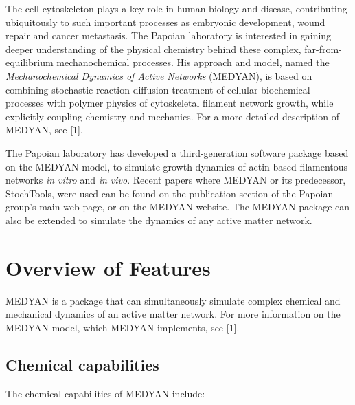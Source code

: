 \documentclass[11pt, oneside]{article}   	%
\begin{document}
 The cell cytoskeleton plays a key role in human biology and disease, contributing ubiquitously
 to such important processes as embryonic development, wound repair and cancer 
 metastasis. The Papoian laboratory is interested in gaining deeper understanding of the
 physical chemistry behind these complex, far-from-equilibrium mechanochemical 
 processes. His approach and model, named the \textit{Mechanochemical Dynamics of Active Networks} 
 (MEDYAN), is based on combining stochastic reaction-diffusion treatment
 of cellular biochemical processes with polymer physics of cytoskeletal filament network 
 growth, while explicitly coupling chemistry and mechanics. For a more detailed description of MEDYAN, see [1].
 
 The Papoian laboratory has developed a third-generation software package based on the MEDYAN
 model, to simulate growth dynamics of actin based filamentous networks \textit{in vitro} and 
 \textit{in vivo}. Recent papers where MEDYAN or its predecessor, StochTools, were used 
 can be found on the publication section of the Papoian group's main web page, or on the MEDYAN website. 
 The MEDYAN package can also be extended to simulate the dynamics of any active matter network.

\section {Overview of Features}

MEDYAN is a package that can simultaneously simulate complex chemical and mechanical dynamics
of an active matter network. For more information on the MEDYAN model, which MEDYAN implements,
see [1].

\subsection{Chemical capabilities}
 The chemical capabilities of MEDYAN include:
\end{document}
